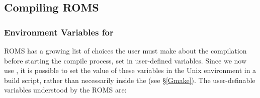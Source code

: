 \subsection{Compiling ROMS}
\label{Build}

\subsubsection{Environment Variables for }
\label{make_var}

ROMS has a growing list of choices the user must make about the
compilation before starting the compile process,
set in user-defined variables. Since we now use , it is
possible to set the value of these variables in the Unix environment
in a build script,
rather than necessarily inside the  (see \S\ref{Gmake}).
The user-definable variables understood by the ROMS  are:
